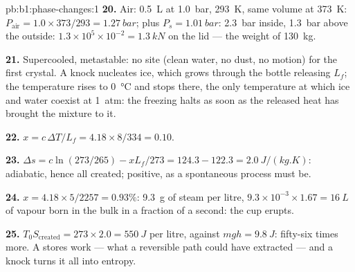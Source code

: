 \begin{solution}{pb:b1:phase-changes:1}
\textbf{20.} Air: \qty{0.5}{L} at \qty{1.0}{bar}, \qty{293}{K}, same volume at
\qty{373}{K}: $P_{\text{air}} = 1.0 \times 373/293 = \qty{1.27}{bar}$; plus
$P_s = \qty{1.01}{bar}$: \qty{2.3}{bar} inside, \qty{1.3}{bar} above the
outside: $1.3 \times 10^5 \times 10^{-2} = \qty{1.3}{kN}$ on the lid --- the
weight of \qty{130}{kg}.

\textbf{21.} Supercooled, metastable: no  site (clean water,
no dust, no motion) for the first crystal. A knock nucleates ice, which
grows through the bottle releasing $L_f$; the temperature rises to
\qty{0}{\degreeCelsius} and stops there, the only temperature at which ice
and water coexist at \qty{1}{atm}: the freezing halts as soon as the
released heat has brought the mixture to it.

\textbf{22.} $x = c\,\Delta T/L_f = 4.18 \times 8/334 = 0.10$.

\textbf{23.} $\Delta s = c\ln(273/265) - xL_f/273 = 124.3 - 122.3 =
\qty{+2.0}{J/(kg.K)}$: adiabatic, hence all created; positive, as a
spontaneous process must be.

\textbf{24.} $x = 4.18 \times 5/2257 = 0.93\%$: \qty{9.3}{g} of steam per litre,
$9.3 \times 10^{-3} \times 1.67 = \qty{16}{L}$ of vapour born in the bulk in a
fraction of a second: the cup erupts.

\textbf{25.} $T_0S_{\mathrm{created}} = 273 \times 2.0 = \qty{550}{J}$ per litre,
against $mgh = \qty{9.8}{J}$: fifty-six times more. A 
stores work --- what a reversible path could have extracted --- and a
knock turns it all into entropy.
\end{solution}
